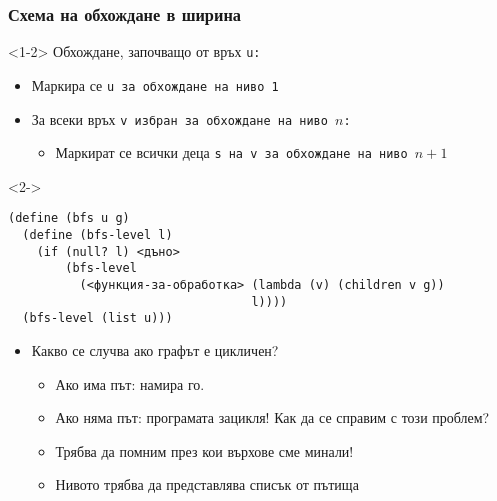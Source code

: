 \documentclass{beamer}
\begin{document}
\begin{frame}[fragile]
  \frametitle{Схема на обхождане в ширина}

  \begin{onlyenv}<1-2>
    Обхождане, започващо от връх \tt u:
    \begin{itemize}
    \item Маркира се \tt u за обхождане на ниво 1
    \item За всеки връх \tt v избран за обхождане на ниво $n$:
      \begin{itemize}
      \item Маркират се всички деца \tt s на \tt v за обхождане на
        ниво $n+1$
      \end{itemize}
    \end{itemize}
  \end{onlyenv}
  \begin{visibleenv}<2->
\begin{verbatim}
(define (bfs u g)
  (define (bfs-level l)
    (if (null? l) <дъно>
        (bfs-level
          (<функция-за-обработка> (lambda (v) (children v g))
                                  l))))
  (bfs-level (list u)))
\end{verbatim}
  \end{visibleenv}
  \begin{itemize}[<+(3)->]
  \item \alert{Какво се случва ако графът е цикличен?}
    \begin{itemize}
    \item Ако има път: намира го.
    \item Ако няма път: програмата зацикля! Как да се справим с този проблем?
    \item Трябва да помним през кои върхове сме минали!
    \item Нивото трябва да представлява \alert{списък от пътища}
    \end{itemize}
  \end{itemize}
\end{frame}
\end{document}
